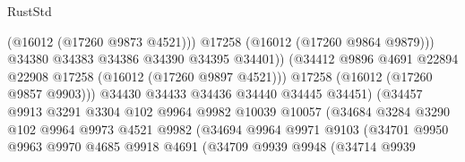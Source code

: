 \begin{lexlean}{RustStd}
\begin{coremodule}
                                            (@16012 (@17260 @9873 @4521)))
                                          @17258
                                          (@16012 (@17260 @9864 @9879)))
                                        @34380
                                        @34383
                                        @34386
                                        @34390
                                        @34395
                                        @34401))
                                    (@34412
                                      @9896
                                      @4691
                                      @22894
                                      @22908
                                      @17258
                                      (@16012 (@17260 @9897 @4521)))
                                    @17258
                                    (@16012 (@17260 @9857 @9903)))
                                  @34430
                                  @34433
                                  @34436
                                  @34440
                                  @34445
                                  @34451)
                                (@34457
                                  @9913
                                  @3291
                                  @3304
                                  @102
                                  @9964
                                  @9982
                                  @10039
                                  @10057
                                  (@34684
                                    @3284
                                    @3290
                                    @102
                                    @9964
                                    @9973
                                    @4521
                                    @9982
                                    (@34694
                                      @9964
                                      @9971
                                      @9103
                                      (@34701
                                        @9950
                                        @9963
                                        @9970
                                        @4685
                                        @9918
                                        @4691
                                        (@34709
                                          @9939
                                          @9948
                                          (@34714
                                            @9939

\end{coremodule}
\end{lexlean}
